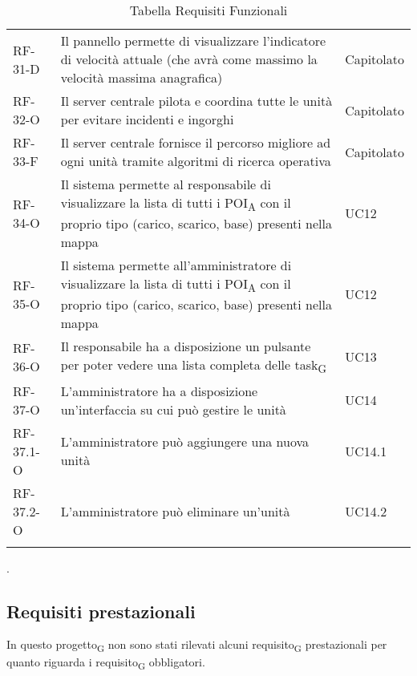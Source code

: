 \begin{longtable}{ 
		>{}p{} 
		>{}p{}
		>{\centering}p{} }
RF-31-D		&	Il pannello permette di visualizzare l'indicatore di velocità attuale (che avrà come massimo la velocità massima anagrafica)	&	Capitolato\tabularnewline				
RF-32-O		&	Il server centrale pilota e coordina tutte le unità per evitare incidenti e ingorghi	&	Capitolato\tabularnewline
RF-33-F		&	Il server centrale fornisce il percorso migliore ad ogni unità tramite algoritmi di ricerca operativa	&	Capitolato\tabularnewline				
RF-34-O		&	Il sistema permette al responsabile di visualizzare la lista di tutti i POI\textsubscript{A} con il proprio tipo (carico, scarico, base) presenti nella mappa	&	UC12\tabularnewline
RF-35-O		&	Il sistema permette all'amministratore di visualizzare la lista di tutti i POI\textsubscript{A} con il proprio tipo (carico, scarico, base) presenti nella mappa	&	UC12\tabularnewline				
RF-36-O		&	Il responsabile ha a disposizione un pulsante per poter vedere una lista completa delle task\textsubscript{G}	&	UC13\tabularnewline			
RF-37-O		&	L'amministratore ha a disposizione un'interfaccia su cui può gestire le unità	&	UC14\tabularnewline
RF-37.1-O		&	L'amministratore può aggiungere una nuova unità	&	UC14.1\tabularnewline
RF-37.2-O		&	L'amministratore può eliminare un'unità	&	UC14.2\tabularnewline
\caption{Tabella Requisiti Funzionali\label{ Tabella Requisiti Funzionali}}
\end{longtable}.
\subsection{Requisiti prestazionali}
In questo progetto\textsubscript{G} non sono stati rilevati alcuni requisito\textsubscript{G} prestazionali per quanto riguarda i requisito\textsubscript{G} obbligatori.
